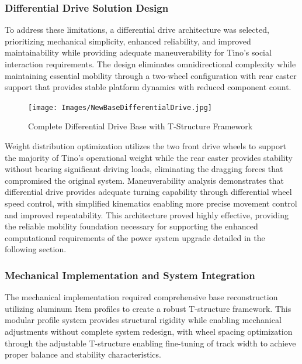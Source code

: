 \subsubsection{Differential Drive Solution Design}

To address these limitations, a differential drive architecture was selected, prioritizing mechanical simplicity, enhanced reliability, and improved maintainability while providing adequate maneuverability for Tino's social interaction requirements. The design eliminates omnidirectional complexity while maintaining essential mobility through a two-wheel configuration with rear caster support that provides stable platform dynamics with reduced component count.

\begin{figure}[H]
    \centering
    \texttt{[image: Images/NewBaseDifferentialDrive.jpg]}
    \caption{Complete Differential Drive Base with T-Structure Framework}
    \label{fig:differential_base_complete}
\end{figure}

Weight distribution optimization utilizes the two front drive wheels to support the majority of Tino's operational weight while the rear caster provides stability without bearing significant driving loads, eliminating the dragging forces that compromised the original system. Maneuverability analysis demonstrates that differential drive provides adequate turning capability through differential wheel speed control, with simplified kinematics enabling more precise movement control and improved repeatability. This architecture proved highly effective, providing the reliable mobility foundation necessary for supporting the enhanced computational requirements of the power system upgrade detailed in the following section.

\subsubsection{Mechanical Implementation and System Integration}

The mechanical implementation required comprehensive base reconstruction utilizing aluminum Item profiles to create a robust T-structure framework. This modular profile system provides structural rigidity while enabling mechanical adjustments without complete system redesign, with wheel spacing optimization through the adjustable T-structure enabling fine-tuning of track width to achieve proper balance and stability characteristics.

